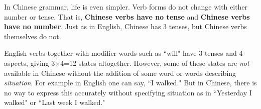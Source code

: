 In Chinese grammar, life is even simpler.
Verb forms do not change with either number or tense.
That is, \textbf{Chinese verbs have no tense}\footnotemark
and \textbf{Chinese verbs have no number}.
Just as in English, Chinese has 3 tenses, but Chinese verbs themselves do not.


\begin{minipage}{\tw-47mm}
English verbs together with modifier words such as ``will"
have 3 tenses and 4 aspects, giving 3$\times$4=12 states altogether.
However, some of these states are \emph{not} available in Chinese without the
addition of some word or words describing \emph{situation}.
For example in English one can say, ``I walked."
But in Chinese, there is no way to express this accurately without
specifying situation as in ``Yesterday I walked" or ``Last week I walked."
\end{minipage}

